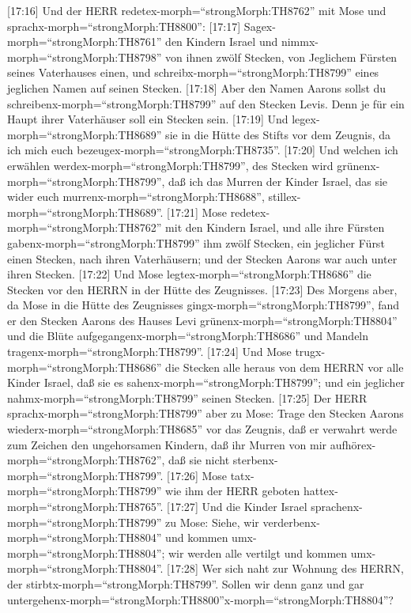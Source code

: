  {[}17:16{]} Und der HERR
redetex-morph=``strongMorph:TH8762'' mit Mose und
sprachx-morph=``strongMorph:TH8800'':  {[}17:17{]}
Sagex-morph=``strongMorph:TH8761'' den Kindern Israel und
nimmx-morph=``strongMorph:TH8798'' von ihnen zwölf Stecken, von
Jeglichem Fürsten seines Vaterhauses einen, und
schreibx-morph=``strongMorph:TH8799'' eines jeglichen Namen auf seinen
Stecken.  {[}17:18{]} Aber den Namen Aarons sollst du
schreibenx-morph=``strongMorph:TH8799'' auf den Stecken Levis. Denn je
für ein Haupt ihrer Vaterhäuser soll ein Stecken sein. 
{[}17:19{]} Und legex-morph=``strongMorph:TH8689'' sie in die Hütte des
Stifts vor dem Zeugnis, da ich mich euch
bezeugex-morph=``strongMorph:TH8735''.  {[}17:20{]} Und
welchen ich erwählen werdex-morph=``strongMorph:TH8799'', des Stecken
wird grünenx-morph=``strongMorph:TH8799'', daß ich das Murren der Kinder
Israel, das sie wider euch murrenx-morph=``strongMorph:TH8688'',
stillex-morph=``strongMorph:TH8689''.  {[}17:21{]} Mose
redetex-morph=``strongMorph:TH8762'' mit den Kindern Israel, und alle
ihre Fürsten gabenx-morph=``strongMorph:TH8799'' ihm zwölf Stecken, ein
jeglicher Fürst einen Stecken, nach ihren Vaterhäusern; und der Stecken
Aarons war auch unter ihren Stecken.  {[}17:22{]} Und Mose
legtex-morph=``strongMorph:TH8686'' die Stecken vor den HERRN in der
Hütte des Zeugnisses.  {[}17:23{]} Des Morgens aber, da Mose
in die Hütte des Zeugnisses gingx-morph=``strongMorph:TH8799'', fand er
den Stecken Aarons des Hauses Levi grünenx-morph=``strongMorph:TH8804''
und die Blüte aufgegangenx-morph=``strongMorph:TH8686'' und Mandeln
tragenx-morph=``strongMorph:TH8799''.  {[}17:24{]} Und Mose
trugx-morph=``strongMorph:TH8686'' die Stecken alle heraus von dem HERRN
vor alle Kinder Israel, daß sie es sahenx-morph=``strongMorph:TH8799'';
und ein jeglicher nahmx-morph=``strongMorph:TH8799'' seinen Stecken.
 {[}17:25{]} Der HERR sprachx-morph=``strongMorph:TH8799''
aber zu Mose: Trage den Stecken Aarons
wiederx-morph=``strongMorph:TH8685'' vor das Zeugnis, daß er verwahrt
werde zum Zeichen den ungehorsamen Kindern, daß ihr Murren von mir
aufhörex-morph=``strongMorph:TH8762'', daß sie nicht
sterbenx-morph=``strongMorph:TH8799''.  {[}17:26{]} Mose
tatx-morph=``strongMorph:TH8799'' wie ihm der HERR geboten
hattex-morph=``strongMorph:TH8765''.  {[}17:27{]} Und die
Kinder Israel sprachenx-morph=``strongMorph:TH8799'' zu Mose: Siehe, wir
verderbenx-morph=``strongMorph:TH8804'' und kommen
umx-morph=``strongMorph:TH8804''; wir werden alle vertilgt und kommen
umx-morph=``strongMorph:TH8804''.  {[}17:28{]} Wer sich
naht zur Wohnung des HERRN, der stirbtx-morph=``strongMorph:TH8799''.
Sollen wir denn ganz und gar
untergehenx-morph=``strongMorph:TH8800''x-morph=``strongMorph:TH8804''?


